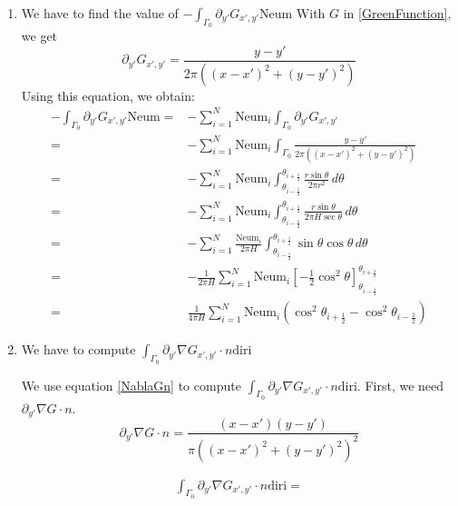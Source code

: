 \documentclass[a4paper,12pt]{article}
\newcommand{\integ}[3]{%
\ensuremath{\displaystyle{\int^{#2}_{#1} #3}}}
\begin{document}
\begin{enumerate}
 \item We have to find the value of $-\integ{\Gamma_0}{}{\partial_{y'} G_{x',y'} \text{Neum}}$
With $G$ in \ref{GreenFunction}, we get
\[
 \partial_{y'}G_{x',y'}=\frac{y-y'}{2\pi \left((x-x')^2+(y-y')^2\right)}
\]
Using this equation, we obtain:
\begin{align}
 -\integ{\Gamma_0}{}{\partial_{y'} G_{x',y'} \text{Neum}}=&-\sum\limits_{i=1}^N \text{Neum}_i \integ{\Gamma_0}{}{\partial_{y'} G_{x',y'}}\\
=&-\sum\limits_{i=1}^N \text{Neum}_i \integ{\Gamma_0}{}{\frac{y-y'}{2\pi \left((x-x')^2+(y-y')^2\right)}}\\
=&-\sum\limits_{i=1}^N \text{Neum}_i \integ{\theta_{i-\frac{1}{2}}}{\theta_{i+\frac{1}{2}}}{\frac{r \sin\theta}{2\pi r^2} \, d\theta}\\
=&-\sum\limits_{i=1}^N \text{Neum}_i \integ{\theta_{i-\frac{1}{2}}}{\theta_{i+\frac{1}{2}}}{\frac{r \sin\theta}{2\pi H \sec\theta} \, d\theta}\\
=&-\sum\limits_{i=1}^N \frac{\text{Neum}_i }{2\pi H}\integ{\theta_{i-\frac{1}{2}}}{\theta_{i+\frac{1}{2}}}{\sin\theta\cos\theta \, d\theta}\\
=&-\frac{1}{2\pi H}\sum\limits_{i=1}^N \text{Neum}_i \left[ -\frac{1}{2} \cos^2\theta \right]_{\theta_{i-\frac{1}{2}}}^{\theta_{i+\frac{1}{2}}}\\
=&\frac{1}{4\pi H}\sum\limits_{i=1}^N \text{Neum}_i \left(\cos^2\theta_{i+\frac{1}{2}}-\cos^2\theta_{i-\frac{1}{2}}\right)
\end{align}

\item We have to compute $\integ{\Gamma_0}{}{\partial_{y'}\nabla G_{x',y'} \cdot n \text{diri}}$

We use equation \ref{NablaGn} to compute $\integ{\Gamma_0}{}{\partial_{y'}\nabla G_{x',y'} \cdot n \text{diri}}$. First, we need $\partial_{y'}\nabla G\cdot n$.
\begin{equation}
 \partial_{y'} \nabla G\cdot n=\frac{(x-x')(y-y')}{\pi \left( (x-x')^2+(y-y')^2\right)^2}
\end{equation}

\begin{align}
 \integ{\Gamma_0}{}{\partial_{y'}\nabla G_{x',y'} \cdot n \text{diri}}=
\end{align}

\end{enumerate}
\end{document}
